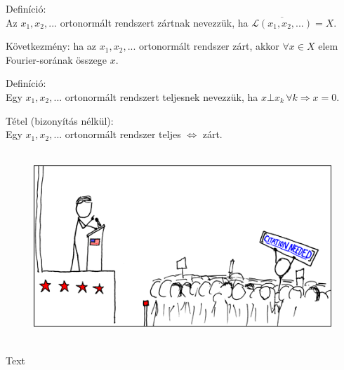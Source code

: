 \documentclass[12pt,a4paper]{scrartcl}
\newenvironment{definicio}{}{}
\newenvironment{tetel}{}{}
\newenvironment{ajanlofig}{\begin{figure}\begin{center}}{
\end{center}\end{figure}}
\begin{document}
\begin{definicio}

Definíció:\\
Az \(x_{1},x_{2},...\) ortonormált rendszert zártnak nevezzük, ha
\(\overline{\mathcal{L}\left( {x_{1},x_{2},...} \right)} = X\).

\end{definicio}

Következmény: ha az \(x_{1},x_{2},...\) ortonormált rendszer zárt, akkor
\(\forall x \in X\) elem Fourier-sorának összege \(x\).

\begin{definicio}

Definíció:\\
Egy \(x_{1},x_{2},...\) ortonormált rendszert teljesnek nevezzük, ha
\(\left. x\bot x_{k}\,\forall k\Rightarrow x = 0 \right.\).

\end{definicio}

\begin{tetel}

Tétel (bizonyítás nélkül):\\
Egy \(x_{1},x_{2},...\) ortonormált rendszer teljes \(\Leftrightarrow\)
zárt.

\end{tetel}

\begin{ajanlo}

\begin{ajanlofig}

\href{https://xkcd.com}{\includegraphics[width=5.20833in,height=2.82292in]{wikipedian_protester.png}}

\end{ajanlofig}

Text

\end{ajanlo}
\end{document}
